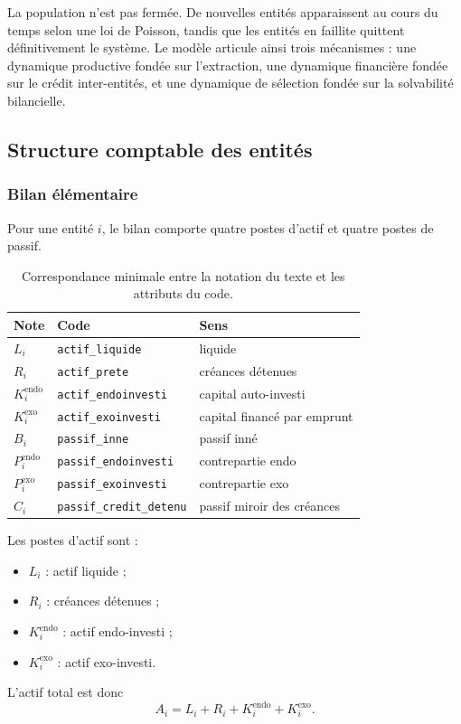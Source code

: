 \documentclass[10pt,a4paper]{article}
\begin{document}
La population n'est pas fermée. De nouvelles entités apparaissent au cours du temps selon une loi de Poisson, tandis que les entités en faillite quittent définitivement le système. Le modèle articule ainsi trois mécanismes : une dynamique productive fondée sur l'extraction, une dynamique financière fondée sur le crédit inter-entités, et une dynamique de sélection fondée sur la solvabilité bilancielle.

\subsection{Structure comptable des entités}

\subsubsection{Bilan élémentaire}

Pour une entité \(i\), le bilan comporte quatre postes d'actif et quatre postes de passif.

\begin{table}[!t]
\centering
\small
\setlength{\tabcolsep}{6pt}
\begin{tabularx}{\textwidth}{@{}l l X@{}}
\toprule
Note & Code & Sens \\
\midrule
\(L_i\) & \texttt{actif\_liquide} & liquide \\
\(R_i\) & \texttt{actif\_prete} & créances détenues \\
\(K_i^{\mathrm{endo}}\) & \texttt{actif\_endoinvesti} & capital auto-investi \\
\(K_i^{\mathrm{exo}}\) & \texttt{actif\_exoinvesti} & capital financé par emprunt \\
\(B_i\) & \texttt{passif\_inne} & passif inné \\
\(P_i^{\mathrm{endo}}\) & \texttt{passif\_endoinvesti} & contrepartie endo \\
\(P_i^{\mathrm{exo}}\) & \texttt{passif\_exoinvesti} & contrepartie exo \\
\(C_i\) & \texttt{passif\_credit\_detenu} & passif miroir des créances \\
\bottomrule
\end{tabularx}
\caption{Correspondance minimale entre la notation du texte et les attributs du code.}
\label{tab:correspondance_code_note}
\end{table}

Les postes d'actif sont :
\begin{itemize}
\item \(L_i\) : actif liquide ;
\item \(R_i\) : créances détenues ;
\item \(K_i^{\mathrm{endo}}\) : actif endo-investi ;
\item \(K_i^{\mathrm{exo}}\) : actif exo-investi.
\end{itemize}
L'actif total est donc
\[
A_i = L_i + R_i + K_i^{\mathrm{endo}} + K_i^{\mathrm{exo}}.
\]
\end{document}
